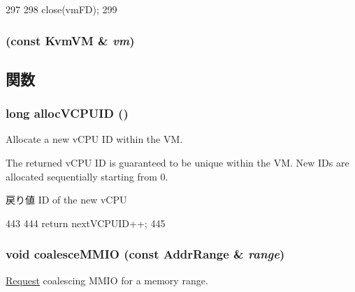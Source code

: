 \begin{DoxyCode}
297 {
298     close(vmFD);
299 }
\end{DoxyCode}
\hypertarget{classKvmVM_a93d7cb38823ea4730a0c04893301c80a}{
\subsubsection[{KvmVM}]{ (const {\bf KvmVM} \& {\em vm})}}
\label{classKvmVM_a93d7cb38823ea4730a0c04893301c80a}


\subsection{関数}
\hypertarget{classKvmVM_a78b0d1b84b25d38fca24a596ebdbcea6}{
\subsubsection[{allocVCPUID}]{\setlength{\rightskip}{0pt plus 5cm}long allocVCPUID ()}}
\label{classKvmVM_a78b0d1b84b25d38fca24a596ebdbcea6}
Allocate a new vCPU ID within the VM.

The returned vCPU ID is guaranteed to be unique within the VM. New IDs are allocated sequentially starting from 0.

\begin{DoxyReturn}{戻り値}
ID of the new vCPU 
\end{DoxyReturn}



\begin{DoxyCode}
443 {
444     return nextVCPUID++;
445 }
\end{DoxyCode}
\hypertarget{classKvmVM_a4584fab486daeedc3dd9cb932ff55917}{
\subsubsection[{coalesceMMIO}]{\setlength{\rightskip}{0pt plus 5cm}void coalesceMMIO (const {\bf AddrRange} \& {\em range})}}
\label{classKvmVM_a4584fab486daeedc3dd9cb932ff55917}
\hyperlink{classRequest}{Request} coalescing MMIO for a memory range.


